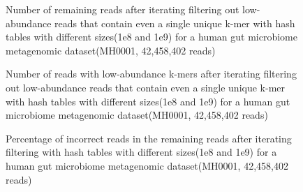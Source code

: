 \documentclass{article}
\begin{document}
\begin{figure}
\caption{Number of remaining reads after iterating filtering out low-abundance 
reads that contain even a single unique k-mer with hash tables with different 
sizes(1e8 and 1e9) for a human gut microbiome metagenomic dataset(MH0001, 
42,458,402 reads)}
\label{num_remaining_reads}
\end{figure}

\begin{figure}
\caption{Number of reads with low-abundance k-mers after iterating filtering out low-abundance 
reads that contain even a single unique k-mer with hash tables with different 
sizes(1e8 and 1e9) for a human gut microbiome metagenomic dataset(MH0001, 
42,458,402 reads)}
\label{num_bad_reads}
\end{figure}



\begin{figure}
\caption{Percentage of incorrect reads in the remaining reads after iterating 
filtering with hash tables with different sizes(1e8 and 1e9) for a human gut 
microbiome metagenomic dataset(MH0001, 42,458,402 reads)}
\label{perc_remaining_reads}
\end{figure}
\end{document}
